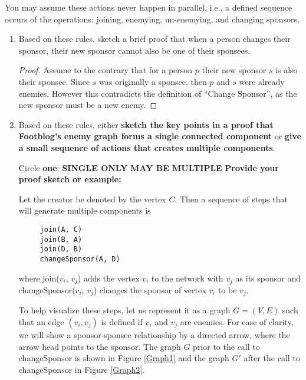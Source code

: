 \documentclass[11pt, oneside]{article}   	%
\theoremstyle{definition}
\theoremstyle{remark}
\begin{document}
You may assume these actions never happen in parallel, i.e., a defined sequence occurs of the operations: joining, enemying, un-enemying, and changing sponsors.
\begin{enumerate}
	\item Based on these rules, sketch a brief proof that when a person changes their sponsor, their new sponsor cannot also be one of their sponsees.
	
	\begin{proof}
		Assume to the contrary that for a person $p$ their new sponsor $s$ is also their sponsee. Since $s$ was originally a sponsee, then $p$ and $s$ were already enemies. However this contradicts the definition of ``Change Sponsor'', as the new sponsor must be a new enemy.
	\end{proof}		
	
	\item Based on these rules, either \textbf{sketch the key points in a proof that    Footblog's enemy graph forms a single connected component} or \textbf{give a small sequence of actions that creates multiple components}.
   
   Circle \textbf{one}: \hfill \textbf{SINGLE ONLY} \hfill \textbf{MAY BE MULTIPLE} \hfill
   \textbf{Provide your proof sketch or example:}
   
   Let the creator be denoted by the vertex $C$. Then a sequence of steps that will generate multiple components is
   \begin{verbatim}
     join(A, C)
     join(B, A)
     join(D, B)
     changeSponsor(A, D)
   \end{verbatim}
   where join($v_i$, $v_j$) adds the vertex $v_i$ to the network with $v_j$ as its sponsor and changeSponsor($v_i$, $v_j$) changes the sponsor of vertex $v_i$ to be $v_j$.
   
   
   To help visualize these steps, let us represent it as a graph $G=(V,E)$ such that an edge $(v_i, v_j)$ is defined if $v_i$ and $v_j$ are enemies. For ease of clarity, we will show a sponsor-sponsee relationship by a directed arrow, where the arrow head points to the sponsor. The graph $G$ prior to the call to changeSponsor is shown in Figure \ref{Graph1} and the graph $G'$ after the call to changeSponsor in Figure \ref{Graph2}.
   
   \begin{figure}[h]           
   	\centering
    \begin{subfigure}[b]{0.45\columnwidth}
    		\centering
\end{subfigure}
\end{figure}
\end{enumerate}
\end{document}
